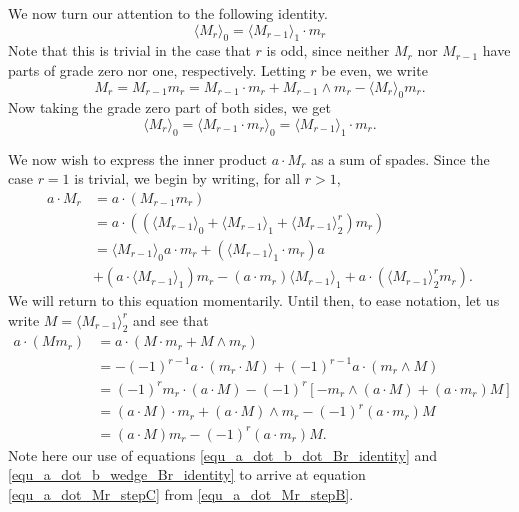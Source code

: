 \documentclass{birkjour}
\theoremstyle{definition}
\theoremstyle{remark}
\numberwithin{equation}{section}
\begin{document}
We now turn our attention to the following identity.
\begin{equation}\label{equ_gr_zero_part_of_Mr}
\langle M_r\rangle_0 = \langle M_{r-1}\rangle_1\cdot m_r
\end{equation}
Note that this is trivial in the case that $r$ is odd, since neither $M_r$ nor $M_{r-1}$ have parts of grade zero nor one, respectively.
Letting $r$ be even, we write
\begin{equation*}
M_r = M_{r-1}m_r = M_{r-1}\cdot m_r + M_{r-1}\wedge m_r - \langle M_r\rangle_0 m_r.
\end{equation*}
Now taking the grade zero part of both sides, we get
\begin{equation*}
\langle M_r\rangle_0 = \langle M_{r-1}\cdot m_r\rangle_0 = \langle M_{r-1}\rangle_1\cdot m_r.
\end{equation*}

We now wish to express the inner product $a\cdot M_r$ as a sum of spades.
Since the case $r=1$ is trivial, we begin by writing, for all $r>1$,
\begin{align}
a\cdot M_r &= a\cdot (M_{r-1}m_r)\nonumber \\
 &= a\cdot((\langle M_{r-1}\rangle_0 + \langle M_{r-1}\rangle_1 + \langle M_{r-1}\rangle_2^r)m_r)\nonumber \\
 &= \langle M_{r-1}\rangle_0a\cdot m_r + (\langle M_{r-1}\rangle_1\cdot m_r)a\nonumber \\
 &+ (a\cdot\langle M_{r-1}\rangle_1)m_r - (a\cdot m_r)\langle M_{r-1}\rangle_1 + a\cdot(\langle M_{r-1}\rangle_2^rm_r).\label{equ_a_dot_Mr_stepA}
\end{align}
We will return to this equation momentarily.  Until then, to ease notation, let us write $M=\langle M_{r-1}\rangle_2^r$ and see that
\begin{align}
a\cdot(Mm_r)
 &= a\cdot(M\cdot m_r + M\wedge m_r)\nonumber \\
 &= -(-1)^{r-1}a\cdot(m_r\cdot M) + (-1)^{r-1}a\cdot(m_r\wedge M)\label{equ_a_dot_Mr_stepB} \\
 &= (-1)^rm_r\cdot(a\cdot M) - (-1)^r\left[-m_r\wedge(a\cdot M)+(a\cdot m_r)M\right]\label{equ_a_dot_Mr_stepC} \\
 &= (a\cdot M)\cdot m_r + (a\cdot M)\wedge m_r - (-1)^r(a\cdot m_r)M\nonumber \\
 &= (a\cdot M)m_r - (-1)^r(a\cdot m_r)M.\label{equ_a_dot_Mr_stepD}
\end{align}
Note here our use of equations \eqref{equ_a_dot_b_dot_Br_identity} and \eqref{equ_a_dot_b_wedge_Br_identity} to
arrive at equation \eqref{equ_a_dot_Mr_stepC} from \eqref{equ_a_dot_Mr_stepB}.
\end{document}
